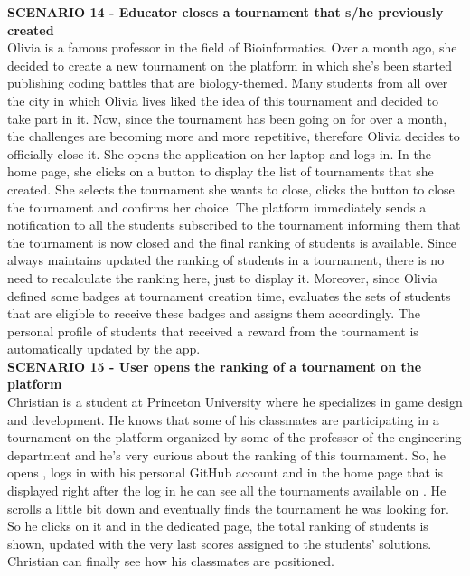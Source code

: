 	\textbf{SCENARIO 14 - Educator closes a tournament that s/he previously created}\\
    Olivia is a famous professor in the field of Bioinformatics. Over a month ago, she decided to create a new tournament on the \app platform in which she's been started publishing coding battles that are biology-themed. Many students from all over the city in which Olivia lives liked the idea of this tournament and decided to take part in it. Now, since the tournament has been going on for over a month, the challenges are becoming more and more repetitive, therefore Olivia decides to officially close it. She opens the \app application on her laptop and logs in. In the home page, she clicks on a button to display the list of tournaments that she created. She selects the tournament she wants to close, clicks the button to close the tournament and confirms her choice. The \app platform immediately sends a notification to all the students subscribed to the tournament informing them that the tournament is now closed and the final ranking of students is available. Since \app always maintains updated the ranking of students in a tournament, there is no need to recalculate the ranking here, just to display it. Moreover, since Olivia defined some badges at tournament creation time, \app evaluates the sets of students that are eligible to receive these badges and assigns them accordingly. The personal profile of students that received a reward from the tournament is automatically updated by the app.\\

    \textbf{SCENARIO 15 - User opens the ranking of a tournament on the \app platform}\\
    Christian is a student at Princeton University where he specializes in game design and development. He knows that some of his classmates are participating in a tournament on the \app platform organized by some of the professor of the engineering department and he's very curious about the ranking of this tournament. So, he opens \app, logs in with his personal GitHub account and in the home page that is displayed right after the log in he can see all the tournaments available on \app. He scrolls a little bit down and eventually finds the tournament he was looking for. So he clicks on it and in the dedicated page, the total ranking of students is shown, updated with the very last scores assigned to the students' solutions. Christian can finally see how his classmates are positioned.\\

